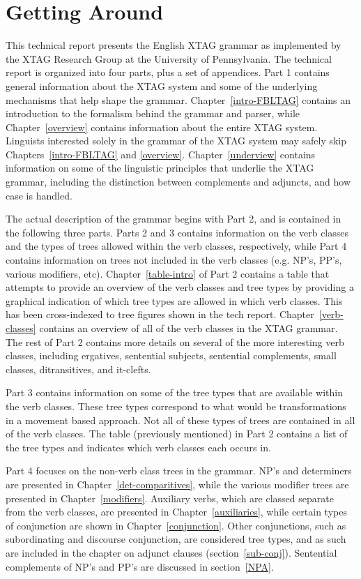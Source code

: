 \chapter{Getting Around}

This technical report presents the English XTAG grammar as implemented by the
XTAG Research Group at the University of Pennsylvania.  The technical report is
organized into four parts, plus a set of appendices.  Part 1 contains general
information about the XTAG system and some of the underlying mechanisms that
help shape the grammar.  Chapter~\ref{intro-FBLTAG} contains an introduction to
the formalism behind the grammar and parser, while Chapter~\ref{overview}
contains information about the entire XTAG system.  Linguists interested solely
in the grammar of the XTAG system may safely skip Chapters~\ref{intro-FBLTAG}
and \ref{overview}.  Chapter~\ref{underview} contains information on some of
the linguistic principles that underlie the XTAG grammar, including the
distinction between complements and adjuncts, and how case is handled.

The actual description of the grammar begins with Part 2, and is contained in
the following three parts.  Parts 2 and 3 contains information on the verb
classes and the types of trees allowed within the verb classes, respectively,
while Part 4 contains information on trees not included in the verb classes
(e.g.  NP's, PP's, various modifiers, etc).  Chapter~\ref{table-intro} of Part
2 contains a table that attempts to provide an overview of the verb classes and
tree types by providing a graphical indication of which tree types are allowed
in which verb classes.  This has been cross-indexed to tree figures shown in
the tech report.  Chapter~\ref{verb-classes} contains an overview of all of the
verb classes in the XTAG grammar.  The rest of Part 2 contains more details on
several of the more interesting verb classes, including ergatives, sentential
subjects, sentential complements, small classes, ditransitives, and it-clefts.

Part 3 contains information on some of the tree types that are available within
the verb classes.  These tree types correspond to what would be transformations
in a movement based approach.  Not all of these types of trees are contained in
all of the verb classes.  The table (previously mentioned) in Part 2 contains a
list of the tree types and indicates which verb classes each occurs in.  

Part 4 focuses on the non-verb class trees in the grammar.  NP's and
determiners are presented in Chapter~\ref{det-comparitives}, while the various
modifier trees are presented in Chapter~\ref{modifiers}.  Auxiliary verbs,
which are classed separate from the verb classes, are presented in
Chapter~\ref{auxiliaries}, while certain types of conjunction are shown in
Chapter~\ref{conjunction}.  Other conjunctions, such as subordinating and
discourse conjunction, are considered tree types, and as such are included in
the chapter on adjunct clauses (section~\ref{sub-conj}).  Sentential
complements of NP's and PP's are discussed in section~\ref{NPA}.

